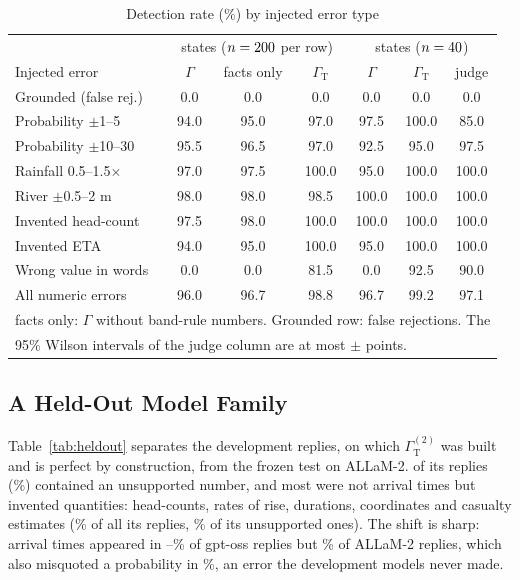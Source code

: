 \documentclass[conference]{IEEEtran}
\begin{document}
\begin{table}[t]
\caption{Detection rate (\%) by injected error type}
\label{tab:guard}
\centering
\footnotesize
\setlength{\tabcolsep}{2.6pt}
\begin{tabular}{lccc|ccc}
\toprule
 & \multicolumn{3}{c|}{\GuardCtx{} states ($n=200$ per row)} & \multicolumn{3}{c}{\JudgeInjStates{} states ($n=40$)}\\
Injected error & $\Gamma$ & facts only & $\Gamma_{\mathrm{T}}$ & $\Gamma$ & $\Gamma_{\mathrm{T}}$ & judge\\
\midrule
Grounded (false rej.) & 0.0 & 0.0 & 0.0 & 0.0 & 0.0 & 0.0\\
\midrule
Probability $\pm$1--5 & 94.0 & 95.0 & 97.0 & 97.5 & 100.0 & 85.0\\
Probability $\pm$10--30 & 95.5 & 96.5 & 97.0 & 92.5 & 95.0 & 97.5\\
Rainfall 0.5--1.5$\times$ & 97.0 & 97.5 & 100.0 & 95.0 & 100.0 & 100.0\\
River $\pm$0.5--2 m & 98.0 & 98.0 & 98.5 & 100.0 & 100.0 & 100.0\\
Invented head-count & 97.5 & 98.0 & 100.0 & 100.0 & 100.0 & 100.0\\
Invented ETA & 94.0 & 95.0 & 100.0 & 95.0 & 100.0 & 100.0\\
Wrong value in words & 0.0 & 0.0 & 81.5 & 0.0 & 92.5 & 90.0\\
\midrule
All numeric errors & 96.0 & 96.7 & 98.8 & 96.7 & 99.2 & 97.1\\
\bottomrule
\multicolumn{7}{l}{\scriptsize facts only: $\Gamma$ without band-rule numbers. Grounded row: false rejections. The}\\
\multicolumn{7}{l}{\scriptsize 95\% Wilson intervals of the judge column are at most $\pm$\JudgeCiMax{} points.}\\
\end{tabular}
\end{table}

\subsection{A Held-Out Model Family}
\label{sec:heldout}
Table~\ref{tab:heldout} separates the development replies, on which $\Gamma_{\mathrm{T}}^{(2)}$ was built and is perfect by construction, from the frozen test on ALLaM-2. \HoUnsup{} of its \HoN{} replies (\HoUnsupPct\%) contained an unsupported number, and most were not arrival times but invented quantities: head-counts, rates of rise, durations, coordinates and casualty estimates (\ErrAllamQty\% of all its replies, \HoCountPct\% of its unsupported ones). The shift is sharp: arrival times appeared in \ErrOssEtaMin--\ErrOssEtaMax\% of gpt-oss replies but \ErrAllamEta\% of ALLaM-2 replies, which also misquoted a probability in \ErrAllamProb\%, an error the development models never made.
\end{document}
